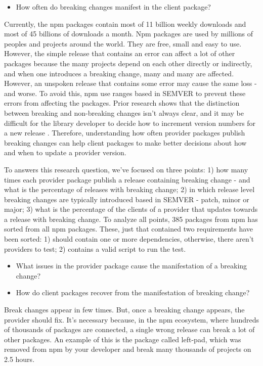 \begin{itemize}
    \item How often do breaking changes manifest in the client package?
\end{itemize}
Currently, the npm packages contain most of 11 billion weekly downloads and most of 45 billions of downloads a month. Npm packages are used by millions of peoples and projects around the world. They are free, small and easy to use. However, the simple release that contains an error can affect a lot of other packages because the many projects depend on each other directly or indirectly, and when one introduces a breaking change, many and many are affected. However, an unspoken release that contains some error may cause the same loss - and worse. To avoid this, npm use ranges based in SEMVER to prevent these errors from affecting the packages. Prior research shows that the distinction between breaking and non-breaking changes isn’t always clear, and it may be difficult for the library developer to decide how to increment version numbers for a new release \cite{noregrets2018}. Therefore, understanding how often provider packages publish breaking changes can help client packages to make better decisions about how and when to update a provider version.

To answers this research question, we’ve focused on three points: 1) how many times each provider package publish a release containing breaking change - and what is the percentage of releases with breaking change; 2) in which release level breaking changes are typically introduced based in SEMVER - patch, minor or major; 3) what is the percentage of the clients of a provider that updates towards a release with breaking change. To analyze all points, 385 packages from npm has sorted from all npm packages. These, just that contained two requirements have been sorted: 1) should contain one or more dependencies, otherwise, there aren’t providers to test; 2) contains a valid script to run the test.

\begin{itemize}
    \item What issues in the provider package cause the manifestation of a breaking change?
\end{itemize}

\begin{itemize}
    \item How do client packages recover from the manifestation of breaking change?
\end{itemize}
Break changes appear in few times. But, once a breaking change appears, the provider should fix. It’s necessary because, in the npm ecosystem, where hundreds of thousands of packages are connected, a single wrong release can break a lot of other packages. An example of this is the package called left-pad, which was removed from npm by your developer and break many thousands of projects on 2.5 hours.

